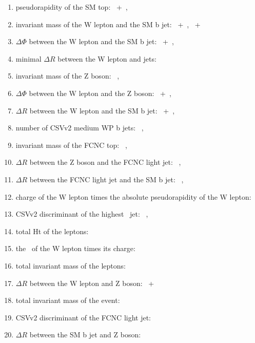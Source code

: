 \begin{enumerate}
	\item pseudorapidity of the SM top: \TTSR\ +\STSR\ \Zut  , \STSR\ \Zct 
	\item invariant mass of the W lepton and the SM b jet: \TTSR\ +\STSR\ \Zut , \TTSR\ +\STSR\ \Zct\ 
	\item $\Delta \Phi$ between the W lepton and the SM b jet: \TTSR\ +\STSR\ \Zut , \STSR\ \Zct\ 
	\item minimal $\Delta R$ between the W lepton and jets: \TTSR\ \Zut 
	\item invariant mass of the Z boson: \TTSR\ \Zut , \TTSR\ \Zct\ 
	\item $\Delta \Phi$ between the W lepton and the Z boson: \TTSR\ +\STSR\ \Zut , \TTSR\ \Zct\ 
	\item $\Delta R$ between the W lepton and the SM b jet: \TTSR\ +\STSR\ \Zut , \TTSR\ \Zct\ 
	\item  number of CSVv2 medium WP b jets: \TTSR\ \Zut , \TTSR\ \Zct\ 
	\item invariant mass of the FCNC top: \TTSR\ \Zut , \TTSR\ \Zct\ 
	\item $\Delta R$ between the Z boson and the FCNC light jet: \TTSR\ \Zut , \TTSR\ \Zct\ 
	\item $\Delta R$ between the FCNC light jet and the SM b jet: \TTSR\ \Zut , \TTSR\ \Zct\ 
	\item charge of the W lepton times the absolute pseudorapidity of the W lepton: \STSR\ \Zut 
	\item CSVv2 discriminant of the highest \pt\ jet: \STSR\ \Zut , \STSR\ \Zct\ 
	\item total Ht of the leptons: \STSR\ \Zut 
	\item the \pt\ of the W lepton times its charge: \STSR\ \Zut 
	\item total invariant mass of the leptons: \STSR\ \Zct\ 
	\item $\Delta R$ between the W lepton and Z boson: \TTSR\ +\STSR\ \Zct\ 
	\item total invariant mass of the event: \TTSR\ \Zct\ 
	\item CSVv2 discriminant of the FCNC light jet: \TTSR\ \Zct\ 
	\item $\Delta R$ between the SM b jet and Z boson: \TTSR\ \Zct\ 
\end{enumerate}

